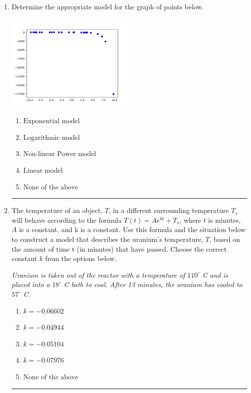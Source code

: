 \documentclass[14pt]{extbook}
\newcommand{\litem}[1]{\item#1\hspace*{-1cm}\rule{\textwidth}{0.4pt}}
\begin{document}
\begin{enumerate}
{\begin{enumerate}[label=\Alph*.]
\end{enumerate} }
\litem{
Determine the appropriate model for the graph of points below.
\begin{center}
    \includegraphics[width=0.5\textwidth]{../Figures/identifyModelGraph11B.png}
\end{center}
\begin{enumerate}[label=\Alph*.]
\item \( \text{Exponential model} \)
\item \( \text{Logarithmic model} \)
\item \( \text{Non-linear Power model} \)
\item \( \text{Linear model} \)
\item \( \text{None of the above} \)

\end{enumerate} }
\litem{
The temperature of an object, $T$, in a different surrounding temperature $T_s$ will behave according to the formula $T(t) = Ae^{kt} + T_s$, where $t$ is minutes, $A$ is a constant, and k is a constant. Use this formula and the situation below to construct a model that describes the uranium's temperature, $T$, based on the amount of time t (in minutes) that have passed. Choose the correct constant $k$ from the options below.
\begin{center}
    \textit{ Uranium is taken out of the reactor with a temperature of $110^{\circ}$ C and is placed into a $18^{\circ}$ C bath to cool. After 13 minutes, the uranium has cooled to $57^{\circ}$ C. }
\end{center}
\begin{enumerate}[label=\Alph*.]
\item \( k = -0.06602 \)
\item \( k = -0.04944 \)
\item \( k = -0.05104 \)
\item \( k = -0.07976 \)
\item \( \text{None of the above} \)


\end{enumerate}}
\end{enumerate}
\end{document}
